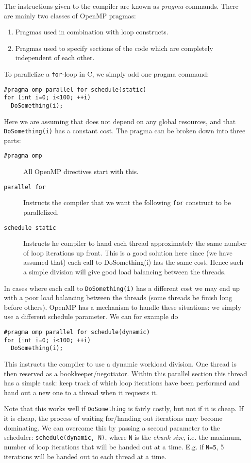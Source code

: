 The instructions given to the compiler are known as \emph{pragma} commands. There are mainly two classes of OpenMP pragmas:
\begin{enumerate}
  \item Pragmas used in combination with loop constructs.
  \item Pragmas used to specify sections of the code which are completely independent of each other.
\end{enumerate}

To parallelize a \texttt{for}-loop in C, we simply add one pragma command:
\begin{lstlisting}
#pragma omp parallel for schedule(static)
for (int i=0; i<100; ++i)
  DoSomething(i);
\end{lstlisting}
Here we are assuming that does not depend on any global resources, and that \texttt{DoSomething(i)} has a constant cost. The pragma can be broken down into three parts:
\begin{description}
  \item[\texttt{\#pragma omp}] All OpenMP directives start with this.
  \item[\texttt{parallel for}] Instructs the compiler that we want the following \texttt{for} construct to be parallelized.
  \item[\texttt{schedule static}] Instructs he compiler to hand each thread approximately the same number of loop iterations up front. This is a good solution here since (we have assumed that) each call to DoSomething(i) has the same cost. Hence such a simple division will give good load balancing between the threads.
\end{description}

In cases where each call to \texttt{DoSomething(i)} has a different cost we may end up with a poor load balancing between the threads (some threads be finish long before others). OpenMP has a mechanism to handle these situations: we simply use a different schedule parameter. We can for example do
\begin{lstlisting}
#pragma omp parallel for schedule(dynamic)
for (int i=0; i<100; ++i)
  DoSomething(i);
\end{lstlisting}
This instructs the compiler to use a dynamic workload division. One thread is then reserved as a bookkeeper/negotiator. Within this parallel section this thread has a simple task: keep track of which loop iterations have been performed and hand out a new one to a thread when it requests it.

Note that this works well if \texttt{DoSomething} is fairly costly, but not if it is cheap. If it is cheap, the process of waiting for/handing out iterations may become dominating. We can overcome this by passing a second parameter to the scheduler: \texttt{schedule(dynamic, N)}, where \texttt{N} is the \emph{chunk size}, i.e. the maximum, number of loop iterations that will be handed out at a time. E.g. if \texttt{N=5}, 5 iterations will be handed out to each thread at a time.

